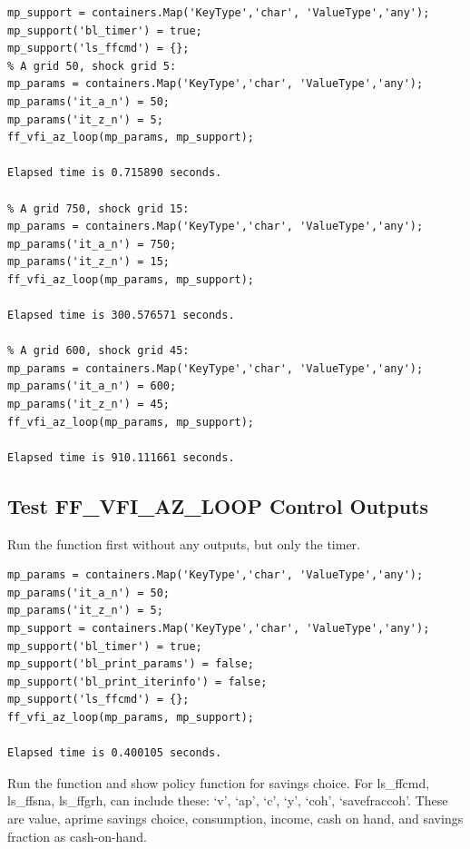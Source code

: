 \documentclass[
]{book}
\begin{document}
\begin{verbatim}
mp_support = containers.Map('KeyType','char', 'ValueType','any');
mp_support('bl_timer') = true;
mp_support('ls_ffcmd') = {};
% A grid 50, shock grid 5:
mp_params = containers.Map('KeyType','char', 'ValueType','any');
mp_params('it_a_n') = 50;
mp_params('it_z_n') = 5;
ff_vfi_az_loop(mp_params, mp_support);

Elapsed time is 0.715890 seconds.

% A grid 750, shock grid 15:
mp_params = containers.Map('KeyType','char', 'ValueType','any');
mp_params('it_a_n') = 750;
mp_params('it_z_n') = 15;
ff_vfi_az_loop(mp_params, mp_support);

Elapsed time is 300.576571 seconds.

% A grid 600, shock grid 45:
mp_params = containers.Map('KeyType','char', 'ValueType','any');
mp_params('it_a_n') = 600;
mp_params('it_z_n') = 45;
ff_vfi_az_loop(mp_params, mp_support);

Elapsed time is 910.111661 seconds.
\end{verbatim}

\hypertarget{test-ff_vfi_az_loop-control-outputs}{%
\subsection{Test FF\_VFI\_AZ\_LOOP Control Outputs}\label{test-ff_vfi_az_loop-control-outputs}}

Run the function first without any outputs, but only the timer.

\begin{verbatim}
mp_params = containers.Map('KeyType','char', 'ValueType','any');
mp_params('it_a_n') = 50;
mp_params('it_z_n') = 5;
mp_support = containers.Map('KeyType','char', 'ValueType','any');
mp_support('bl_timer') = true;
mp_support('bl_print_params') = false;
mp_support('bl_print_iterinfo') = false;
mp_support('ls_ffcmd') = {};
ff_vfi_az_loop(mp_params, mp_support);

Elapsed time is 0.400105 seconds.
\end{verbatim}

Run the function and show policy function for savings choice. For
ls\_ffcmd, ls\_ffsna, ls\_ffgrh, can include these: `v', `ap', `c', `y',
`coh', `savefraccoh'. These are value, aprime savings choice,
consumption, income, cash on hand, and savings fraction as cash-on-hand.
\end{document}

